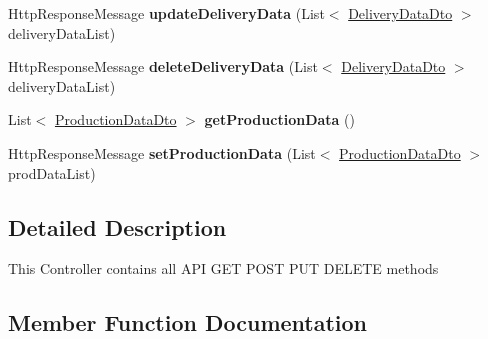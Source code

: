 \begin{DoxyCompactItemize}
Http\+Response\+Message {\bfseries update\+Delivery\+Data} (List$<$ \hyperlink{classkpi_mvc_api_1_1_data_transfer_objects_1_1_delivery_data_dto}{Delivery\+Data\+Dto} $>$ delivery\+Data\+List)
\item 
\mbox{\label{classkpi_mvc_api_1_1_controllers_1_1_kpidata_controller_a2494970082b1b00fd50353e4aa840188}} 
Http\+Response\+Message {\bfseries delete\+Delivery\+Data} (List$<$ \hyperlink{classkpi_mvc_api_1_1_data_transfer_objects_1_1_delivery_data_dto}{Delivery\+Data\+Dto} $>$ delivery\+Data\+List)
\item 
\mbox{\label{classkpi_mvc_api_1_1_controllers_1_1_kpidata_controller_a0ab15672f7d3b5a077a8c4b0612feab8}} 
List$<$ \hyperlink{classkpi_mvc_api_1_1_data_transfer_objects_1_1_production_data_dto}{Production\+Data\+Dto} $>$ {\bfseries get\+Production\+Data} ()
\item 
\mbox{\label{classkpi_mvc_api_1_1_controllers_1_1_kpidata_controller_a7f6c6c359f37a9b9a83d481b5c26a037}} 
Http\+Response\+Message {\bfseries set\+Production\+Data} (List$<$ \hyperlink{classkpi_mvc_api_1_1_data_transfer_objects_1_1_production_data_dto}{Production\+Data\+Dto} $>$ prod\+Data\+List)
\end{DoxyCompactItemize}


\subsection{Detailed Description}
This Controller contains all A\+PI G\+ET P\+O\+ST P\+UT D\+E\+L\+E\+TE methods 



\subsection{Member Function Documentation}
\mbox{\label{classkpi_mvc_api_1_1_controllers_1_1_kpidata_controller_a0ab15672f7d3b5a077a8c4b0612feab8}} 
